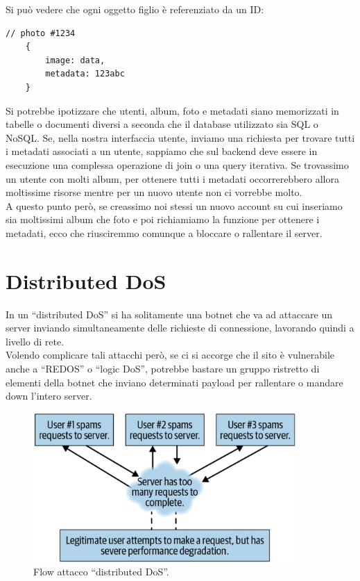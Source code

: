 Si può vedere che ogni oggetto figlio è referenziato da
un ID:
\begin{lstlisting}[language={}]
	// photo #1234
	{
		image: data,
		metadata: 123abc
	}
\end{lstlisting}

Si potrebbe ipotizzare che utenti, album, foto e metadati siano memorizzati in tabelle o documenti diversi a seconda che il database utilizzato sia SQL o NoSQL. Se, nella nostra interfaccia utente, inviamo una richiesta per trovare tutti i metadati associati a un utente, sappiamo che sul backend deve essere in esecuzione una complessa operazione di join o una query iterativa. Se trovassimo un utente con molti album, per ottenere tutti i metadati occorrerebbero allora moltissime risorse mentre per un nuovo utente non ci vorrebbe molto.\\

A questo punto però, se creassimo noi stessi un nuovo account su cui inseriamo sia moltissimi album che foto e poi richiamiamo la funzione per ottenere i metadati, ecco che riusciremmo comunque a bloccare o rallentare il server.

\newpage

\section{Distributed DoS}

In un ``distributed DoS'' si ha solitamente una botnet che va ad attaccare un server inviando simultaneamente delle richieste di connessione, lavorando quindi a livello di rete.\\

Volendo complicare tali attacchi però, se ci si accorge che il sito è vulnerabile anche a ``REDOS'' o ``logic DoS'', potrebbe bastare un gruppo ristretto di elementi della botnet che inviano determinati payload per rallentare o mandare down l'intero server.

\begin{figure}[H]
	\centering
	\includegraphics[width=10cm, keepaspectratio]{capitoli/web_security/imgs/distributed_dos_flow.png}
	\caption{Flow attacco ``distributed DoS''.}
	\label{fig:distributed_dos_flow}
\end{figure}

